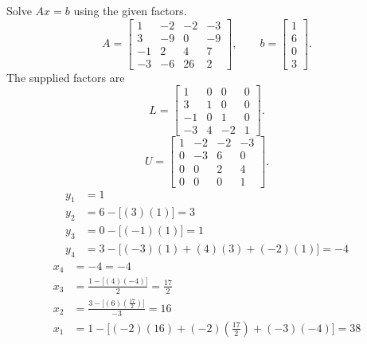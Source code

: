 \goal Solve $Ax=b$ using the given factors.
\[A=\left[\begin{matrix}1 & -2 & -2 & -3\\3 & -9 & 0 & -9\\-1 & 2 & 4 & 7\\-3 & -6 & 26 & 2\end{matrix}\right],\qquad b=\left[\begin{matrix}1\\6\\0\\3\end{matrix}\right].\]
The supplied factors are
\[L=\left[\begin{matrix}1 & 0 & 0 & 0\\3 & 1 & 0 & 0\\-1 & 0 & 1 & 0\\-3 & 4 & -2 & 1\end{matrix}\right].\]
\[U=\left[\begin{matrix}1 & -2 & -2 & -3\\0 & -3 & 6 & 0\\0 & 0 & 2 & 4\\0 & 0 & 0 & 1\end{matrix}\right].\]
\begin{align*}y_{1}&=1\\
y_{2}&=6-\bigl[(3)(1)\bigr]=3\\
y_{3}&=0-\bigl[(-1)(1)\bigr]=1\\
y_{4}&=3-\bigl[(-3)(1)+(4)(3)+(-2)(1)\bigr]=-4\end{align*}
\begin{align*}x_{4}&=-4=-4\\
x_{3}&=\frac{1-\bigl[(4)(-4)\bigr]}{2}=\frac{17}{2}\\
x_{2}&=\frac{3-\bigl[(6)(\frac{17}{2})\bigr]}{-3}=16\\
x_{1}&=1-\bigl[(-2)(16)+(-2)(\frac{17}{2})+(-3)(-4)\bigr]=38\end{align*}

